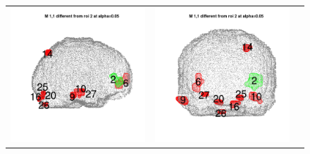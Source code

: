 \documentclass[12pt]{article}
\begin{document}
\begin{figure}[h]
\centering
\begin{tabular}{ccc}
\includegraphics[scale = 0.24]{../a7plots/d_1r_2_view1.png} & 
\includegraphics[scale = 0.24]{../a7plots/d_1r_2_view2.png} & 

\end{tabular}
\end{figure}
\end{document}
